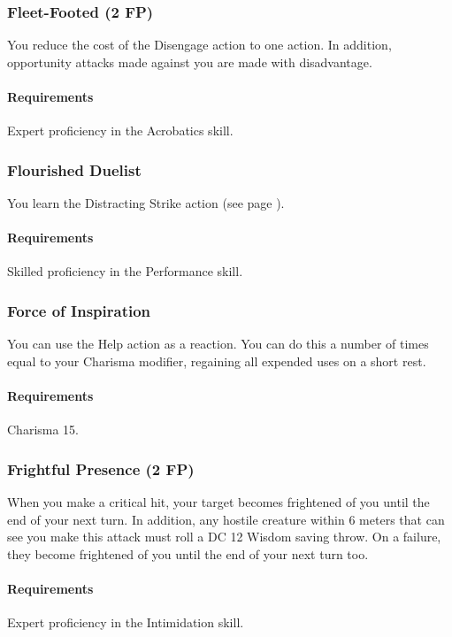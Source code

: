 \subsubsection{Fleet-Footed (2 FP)} \label{feat::fleetfooted}
    You reduce the cost of the Disengage action to one action.
    In addition, opportunity attacks made against you are made with disadvantage.
    \paragraph{Requirements} Expert proficiency in the Acrobatics skill.
\subsubsection{Flourished Duelist} \label{feat::flourishedduelist}
    You learn the Distracting Strike action (see page \pageref{act::distractingstrike}).
    \paragraph{Requirements} Skilled proficiency in the Performance skill.
\subsubsection{Force of Inspiration} \label{feat::forceofinspiration}
    You can use the Help action as a reaction.
    You can do this a number of times equal to your Charisma modifier, regaining all expended uses on a short rest.
    \paragraph{Requirements} Charisma 15.
\subsubsection{Frightful Presence (2 FP)} \label{feat::frightfulpresence}
    When you make a critical hit, your target becomes frightened of you until the end of your next turn.
    In addition, any hostile creature within 6 meters that can see you make this attack must roll a DC 12 Wisdom saving throw.
    On a failure, they become frightened of you until the end of your next turn too.
    \paragraph{Requirements} Expert proficiency in the Intimidation skill.
